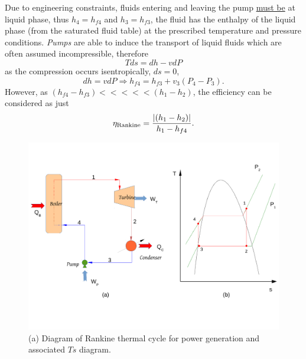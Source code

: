      Due to engineering constraints, fluids entering and leaving the pump \underline{must be} at liquid phase, thus $h_{4}=h_{f4}$ and $h_{3}=h_{f3}$, \ie the fluid has the enthalpy of the liquid phase (from the saturated fluid table) at the prescribed temperature and pressure conditions. {\it Pumps} are able to induce the transport of liquid fluids which are often assumed incompressible, therefore
          \begin{displaymath}
                Tds = dh - v dP
          \end{displaymath}
as the compression occurs isentropically, \ie $ds=0$,
          \begin{displaymath}
                dh = v dP \Rightarrow h_{f4} = h_{f3} + v_{3}\left(P_{4}-P_{3}\right).
          \end{displaymath}
However, as $\left(h_{f4}-h_{f3}\right) <<<<< \left(h_{1}-h_{2}\right)$, the efficiency can be considered as just
           \begin{displaymath}
               \eta_{\text{Rankine}} = \displaystyle\frac{\left|\left(h_{1}-h_{2}\right)\right|}{h_{1}-h_{f4}}.
           \end{displaymath}     
%
   \begin{figure}[h]
      \begin{center}
         \includegraphics[width=\columnwidth,clip]{./Figs/Mod3PowerSystemDiagram}
      \end{center}
      \caption{ (a) Diagram of Rankine thermal cycle for power generation and associated $Ts$ diagram.}\label{Chapter:ThermodynamicPropertiesPureFluids:Fig:Fig04}
   \end{figure}



